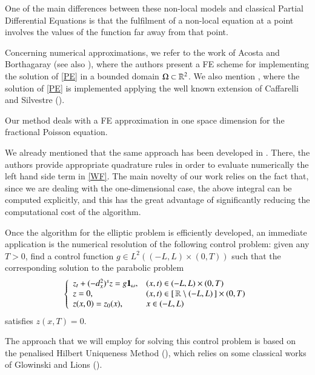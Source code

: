 One of the main differences between these non-local models and classical Partial Differential Equations is that the fulfilment of a non-local equation at a point involves the values of the function far away from that point.

Concerning numerical approximations, we refer to the work \cite{acosta2017fractional} of Acosta and Borthagaray (see also \cite{acosta2017short}), where the authors present a FE scheme for implementing the solution of \eqref{PE} in a bounded domain $\Omega\subset\mathbb{R}^2$. We also mention \cite{nochetto2015pde}, where the solution of \eqref{PE} is implemented applying the well known extension of Caffarelli and Silvestre (\cite{caffarelli2007extension}).   

Our method deals with a FE approximation in one space dimension for the fractional Poisson equation. 

We already mentioned that the same approach has been developed in \cite{acosta2017short,acosta2017fractional}. There, the authors provide appropriate quadrature rules in order to evaluate numerically the left hand side term in \eqref{WF}. The main novelty of our work relies on the fact that, since we are dealing with the one-dimensional case, the above integral can be computed explicitly, and this has the great advantage of significantly reducing the computational cost of the algorithm. 

Once the algorithm for the elliptic problem is efficiently developed, an immediate application is the numerical resolution of the following control problem: given any $T>0$, find a control function $g\in L^2((-L,L)\times(0,T))$ such that the corresponding solution to the parabolic problem 
\begin{align}\label{heat_frac}
	\left\{\begin{array}{ll}
	z_t + (-d_x^2)^{s}z = g\mathbf{1}_{\omega}, & (x,t)\in (-L,L)\times(0,T)
	\\
	z=0, & (x,t)\in[\,\mathbb{R}\setminus (-L,L)\,]\times(0,T)
	\\
	z(x,0)=z_0(x), & x\in (-L,L)
	\end{array}\right.
\end{align} 
satisfies $z(x,T)=0$. 

The approach that we will employ for solving this control problem is based on the penalised Hilbert Uniqueness Method (\cite{boyer2013penalised}), which relies on some classical works of Glowinski and Lions (\cite{glowinski1995exact,glowinski2008exact}).   


